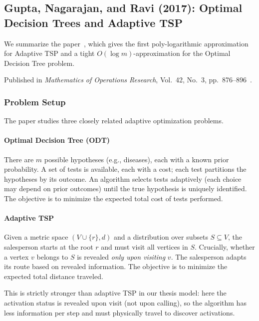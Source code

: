\subsection{Gupta, Nagarajan, and Ravi (2017): Optimal Decision Trees and Adaptive TSP}\label{sec:adt-notes}

We summarize the paper~\cite{GuptaNagarajanRavi2017}, which gives the first poly-logarithmic approximation for Adaptive TSP and a tight $O(\log m)$-approximation for the Optimal Decision Tree problem.

Published in \emph{Mathematics of Operations Research}, Vol.~42, No.~3, pp.~876--896~\cite{GuptaNagarajanRavi2017}.

\subsubsection{Problem Setup}

The paper studies three closely related adaptive optimization problems.

\paragraph{Optimal Decision Tree (ODT)}

There are $m$ possible hypotheses (e.g., diseases), each with a known prior probability. A set of tests is available, each with a cost; each test partitions the hypotheses by its outcome. An algorithm selects tests adaptively (each choice may depend on prior outcomes) until the true hypothesis is uniquely identified. The objective is to minimize the expected total cost of tests performed.

\paragraph{Adaptive TSP}

Given a metric space $(V \cup \{r\}, d)$ and a distribution over subsets $S \subseteq V$, the salesperson starts at the root $r$ and must visit all vertices in $S$. Crucially, whether a vertex $v$ belongs to $S$ is revealed \emph{only upon visiting} $v$. The salesperson adapts its route based on revealed information. The objective is to minimize the expected total distance traveled.

This is strictly stronger than adaptive TSP in our thesis model: here the activation status is revealed upon visit (not upon calling), so the algorithm has less information per step and must physically travel to discover activations.

